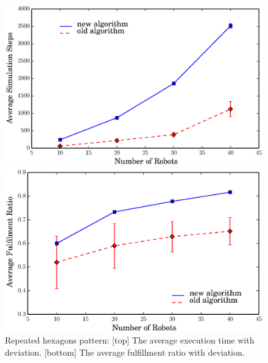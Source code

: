   \begin{figure}
    \begin{minipage}[b]{0.9\linewidth}
      \includegraphics[trim=0.5cm 0cm 1.5cm 0,clip=true,width=\linewidth]{figs/steps_hexagon}
    \end{minipage}
    \begin{minipage}[b]{0.9\linewidth}
      \includegraphics[trim=0.5cm 0 1.5cm 0,clip=true,width=\linewidth]{figs/ratio_hexagon}
    \end{minipage}
    \caption{Repeated hexagons pattern: [top] The average execution time with deviation. [bottom] The average fulfillment ratio with deviation.}
    \label{fig:hex_comp}
  \end{figure}
